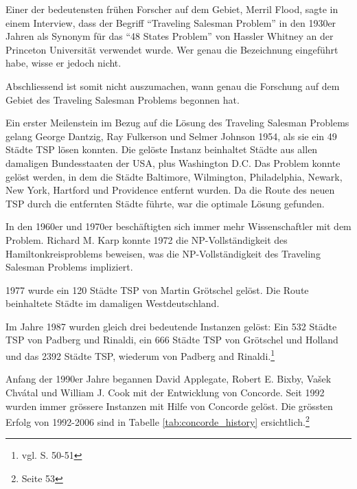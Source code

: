 \documentclass[11pt,a4paper]{article}
\begin{document}
\medskip

Einer der bedeutensten frühen Forscher auf dem Gebiet, Merril Flood, sagte in einem Interview, dass der Begriff "`Traveling Salesman Problem"' in den 1930er Jahren als Synonym für das "`48 States Problem"' von Hassler Whitney an der Princeton Universität verwendet wurde. Wer genau die Bezeichnung eingeführt habe, wisse er jedoch nicht.\cite{interview_merrill_flood84}

Abschliessend ist somit nicht auszumachen, wann genau die Forschung auf dem Gebiet des Traveling Salesman Problems begonnen hat.

\medskip

Ein erster Meilenstein im Bezug auf die Lösung des Traveling Salesman Problems gelang George Dantzig, Ray Fulkerson und Selmer Johnson 1954, als sie ein 49 Städte TSP lösen konnten. Die gelöste Instanz beinhaltet Städte aus allen damaligen Bundesstaaten der USA, plus Washington D.C. Das Problem konnte gelöst werden, in dem die Städte Baltimore, Wilmington, Philadelphia, Newark, New York, Hartford und Providence entfernt wurden. Da die Route des neuen TSP durch die entfernten Städte führte, war die optimale Lösung gefunden.

In den 1960er und 1970er beschäftigten sich immer mehr Wissenschaftler mit dem Problem. Richard M. Karp konnte 1972 die NP-Vollständigkeit des Hamiltonkreisproblems beweisen, was die NP-Vollständigkeit des Traveling Salesman Problems impliziert.

1977 wurde ein 120 Städte TSP von Martin Grötschel gelöst. Die Route beinhaltete Städte im damaligen Westdeutschland.

Im Jahre 1987 wurden gleich drei bedeutende Instanzen gelöst: Ein 532 Städte TSP von Padberg und Rinaldi, ein 666 Städte TSP von Grötschel und Holland und das 2392 Städte TSP, wiederum von Padberg and Rinaldi.\footnote{vgl. \cite{applegate06} S. 50-51}

Anfang der 1990er Jahre begannen David Applegate, Robert E. Bixby, Vašek Chvátal und William J. Cook mit der Entwicklung von Concorde. Seit 1992 wurden immer grössere Instanzen mit Hilfe von Concorde gelöst. Die grössten Erfolg von 1992-2006 sind in Tabelle \ref{tab:concorde_history} ersichtlich.\footnote{\cite{applegate06} Seite 53}
\end{document}
